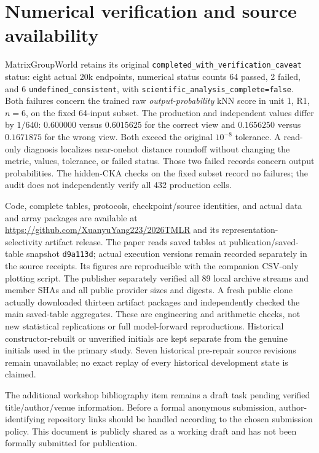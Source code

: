 \documentclass[10pt]{article}
\begin{document}
\section{Numerical verification and source availability}
\label{app:verification}
MatrixGroupWorld retains its original
\texttt{completed\_with\_verification\_caveat} status:
eight actual 20k endpoints, numerical status counts 64 passed, 2 failed,
and 6 \texttt{undefined\_consistent}, with
\texttt{scientific\_analysis\_complete=false}. Both failures concern the
trained raw \emph{output-probability} kNN score in unit 1, R1, $n=6$, on
the fixed 64-input subset. The production and independent values differ
by $1/640$: $0.600000$ versus $0.6015625$ for the correct view and
$0.1656250$ versus $0.1671875$ for the wrong view. Both exceed the original
$10^{-8}$ tolerance. A read-only diagnosis localizes near-onehot distance
roundoff without changing the metric, values, tolerance, or failed status.
Those two failed records concern output probabilities. The hidden-CKA
checks on the fixed subset record no failures; the audit does not
independently verify all 432 production cells.

Code, complete tables, protocols, checkpoint/source identities, and actual
data and array packages are available at
\url{https://github.com/XuanyuYang223/2026TMLR} and its
representation-selectivity artifact release. The paper reads saved tables
at publication/saved-table snapshot \texttt{d9a113d}; actual execution
versions remain recorded separately in the source receipts. Its figures are reproducible with the
companion CSV-only plotting script. The publisher separately verified all
89 local archive streams and member SHAs and all public provider sizes and
digests. A fresh public clone actually downloaded thirteen artifact
packages and independently checked the main saved-table aggregates. These
are engineering and arithmetic checks, not new statistical replications or
full model-forward reproductions. Historical constructor-rebuilt or
unverified initials are kept separate from the genuine initials used in
the primary study. Seven historical pre-repair source revisions remain
unavailable; no exact replay of every historical development state is
claimed.

The additional workshop bibliography item remains a draft task pending
verified title/author/venue information. Before a formal anonymous
submission, author-identifying repository links should be handled according
to the chosen submission policy. This document is publicly shared as a
working draft and has not been formally submitted for publication.
\end{document}
